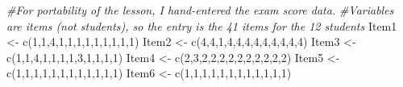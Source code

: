 \documentclass[
  english,
]{book}
\newenvironment{Shaded}{\begin{snugshade}}{\end{snugshade}}
\newcommand{\CommentTok}[1]{\textcolor[rgb]{0.56,0.35,0.01}{\textit{#1}}}
\newcommand{\DecValTok}[1]{\textcolor[rgb]{0.00,0.00,0.81}{#1}}
\newcommand{\FunctionTok}[1]{\textcolor[rgb]{0.00,0.00,0.00}{#1}}
\newcommand{\NormalTok}[1]{#1}
\newcommand{\OtherTok}[1]{\textcolor[rgb]{0.56,0.35,0.01}{#1}}
\begin{document}
\begin{Shaded}
\begin{Highlighting}[]
\CommentTok{\#For portability of the lesson, I hand{-}entered the exam score data. }
\CommentTok{\#Variables are items (not students), so the entry is the 41 items for the 12 students}
\NormalTok{Item1 }\OtherTok{\textless{}{-}} \FunctionTok{c}\NormalTok{(}\DecValTok{1}\NormalTok{,}\DecValTok{1}\NormalTok{,}\DecValTok{4}\NormalTok{,}\DecValTok{1}\NormalTok{,}\DecValTok{1}\NormalTok{,}\DecValTok{1}\NormalTok{,}\DecValTok{1}\NormalTok{,}\DecValTok{1}\NormalTok{,}\DecValTok{1}\NormalTok{,}\DecValTok{1}\NormalTok{,}\DecValTok{1}\NormalTok{,}\DecValTok{1}\NormalTok{)}
\NormalTok{Item2 }\OtherTok{\textless{}{-}} \FunctionTok{c}\NormalTok{(}\DecValTok{4}\NormalTok{,}\DecValTok{4}\NormalTok{,}\DecValTok{1}\NormalTok{,}\DecValTok{4}\NormalTok{,}\DecValTok{4}\NormalTok{,}\DecValTok{4}\NormalTok{,}\DecValTok{4}\NormalTok{,}\DecValTok{4}\NormalTok{,}\DecValTok{4}\NormalTok{,}\DecValTok{4}\NormalTok{,}\DecValTok{4}\NormalTok{,}\DecValTok{4}\NormalTok{)}
\NormalTok{Item3 }\OtherTok{\textless{}{-}} \FunctionTok{c}\NormalTok{(}\DecValTok{1}\NormalTok{,}\DecValTok{1}\NormalTok{,}\DecValTok{4}\NormalTok{,}\DecValTok{1}\NormalTok{,}\DecValTok{1}\NormalTok{,}\DecValTok{1}\NormalTok{,}\DecValTok{1}\NormalTok{,}\DecValTok{3}\NormalTok{,}\DecValTok{1}\NormalTok{,}\DecValTok{1}\NormalTok{,}\DecValTok{1}\NormalTok{,}\DecValTok{1}\NormalTok{)}
\NormalTok{Item4 }\OtherTok{\textless{}{-}} \FunctionTok{c}\NormalTok{(}\DecValTok{2}\NormalTok{,}\DecValTok{3}\NormalTok{,}\DecValTok{2}\NormalTok{,}\DecValTok{2}\NormalTok{,}\DecValTok{2}\NormalTok{,}\DecValTok{2}\NormalTok{,}\DecValTok{2}\NormalTok{,}\DecValTok{2}\NormalTok{,}\DecValTok{2}\NormalTok{,}\DecValTok{2}\NormalTok{,}\DecValTok{2}\NormalTok{,}\DecValTok{2}\NormalTok{)}
\NormalTok{Item5 }\OtherTok{\textless{}{-}} \FunctionTok{c}\NormalTok{(}\DecValTok{1}\NormalTok{,}\DecValTok{1}\NormalTok{,}\DecValTok{1}\NormalTok{,}\DecValTok{1}\NormalTok{,}\DecValTok{1}\NormalTok{,}\DecValTok{1}\NormalTok{,}\DecValTok{1}\NormalTok{,}\DecValTok{1}\NormalTok{,}\DecValTok{1}\NormalTok{,}\DecValTok{1}\NormalTok{,}\DecValTok{1}\NormalTok{,}\DecValTok{1}\NormalTok{)}
\NormalTok{Item6 }\OtherTok{\textless{}{-}} \FunctionTok{c}\NormalTok{(}\DecValTok{1}\NormalTok{,}\DecValTok{1}\NormalTok{,}\DecValTok{1}\NormalTok{,}\DecValTok{1}\NormalTok{,}\DecValTok{1}\NormalTok{,}\DecValTok{1}\NormalTok{,}\DecValTok{1}\NormalTok{,}\DecValTok{1}\NormalTok{,}\DecValTok{1}\NormalTok{,}\DecValTok{1}\NormalTok{,}\DecValTok{1}\NormalTok{,}\DecValTok{1}\NormalTok{)}

\end{Highlighting}
\end{Shaded}
\end{document}
